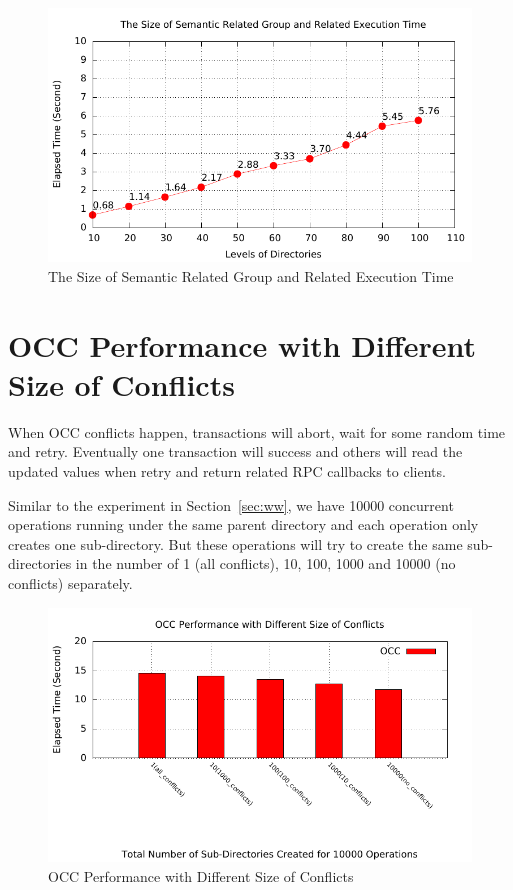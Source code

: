 \begin{figure}[ht]
	\centering
	\includegraphics[width=\linewidth]{figs/srgSize.pdf}
	\caption{The Size of Semantic Related Group and Related Execution Time}
	\label{fig:srg}
\end{figure}

\section{OCC Performance with Different Size of Conflicts}

When OCC conflicts happen, transactions will abort, wait for some random time and retry. Eventually one transaction will success and others will read the updated values when retry and return related RPC callbacks to clients.

\noindent Similar to the experiment in Section~\ref{sec:ww}, we have 10000 concurrent operations running under the same parent directory and each operation only creates one sub-directory. But these operations will try to create the same sub-directories in the number of 1 (all conflicts), 10, 100, 1000 and 10000 (no conflicts) separately.

\begin{figure}[ht]
	\centering
	\includegraphics[width=\linewidth]{figs/conflict.pdf}
	\caption{OCC Performance with Different Size of Conflicts}
	\label{fig:conflict}
\end{figure}


